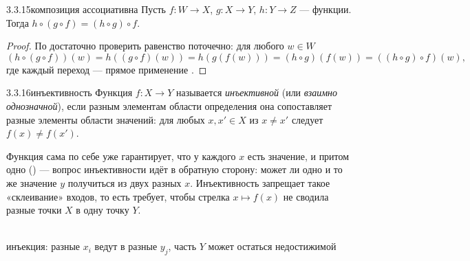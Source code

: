 \begin{lemma}{3.3.15}{композиция ассоциативна}
Пусть $f:W\to X$, $g:X\to Y$, $h:Y\to Z$ — функции. Тогда
$h\circ(g\circ f) = (h\circ g)\circ f$.
\end{lemma}

\begin{proof}
По  достаточно проверить равенство поточечно: для любого
$w\in W$
\[
  (h\circ(g\circ f))(w) = h((g\circ f)(w)) = h(g(f(w))) = (h\circ g)(f(w)) = ((h\circ g)\circ f)(w),
\]
где каждый переход — прямое применение .
\end{proof}

\begin{definition}{3.3.16}{инъективность}
Функция $f:X\to Y$ называется \emph{инъективной} (или \emph{взаимно однозначной}), если
разным элементам области определения она сопоставляет разные элементы области значений: для
любых $x,x'\in X$ из $x\neq x'$ следует $f(x)\neq f(x')$.
\end{definition}

\begin{intuition}
Функция сама по себе уже гарантирует, что у каждого $x$ есть значение, и притом одно
() — вопрос инъективности идёт в обратную сторону:
может ли одно и то же значение $y$ получиться из двух разных $x$. Инъективность запрещает
такое «склеивание» входов, то есть требует, чтобы стрелка $x \mapsto f(x)$ не сводила
разные точки $X$ в одну точку $Y$.

\begin{center}
\\
{\footnotesize\color{intuitiongray}инъекция: разные $x_i$ ведут в разные $y_j$, часть $Y$
может остаться недостижимой}
\end{center}
\end{intuition}

